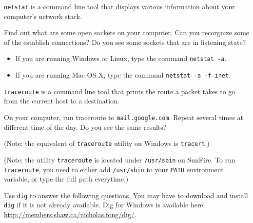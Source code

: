 \documentclass[a4paper,11pt]{exam}
\begin{document}
\begin{questions}

\texttt{netstat} is a command line tool that displays various information about your computer's network stack.

Find out what are some open sockets on your computer.  Can you recorgnize some of the establish connections?  Do you see some sockets that are in listening state?
\begin{itemize}
\item If you are running Windows or Linux, type the command \texttt{netstat -a}.
\item If you are running Mac OS X, type the command \texttt{netstat -a -f inet}.
\end{itemize}



\texttt{traceroute} is a command line tool that prints the route a packet takes to go from the current host to a destination.

On your computer, run traceroute to \texttt{mail.google.com}.  Repeat several times at different time of the day.  Do you see the same results?

(Note: the equivalent of \texttt{traceroute} utility on Windows is \texttt{tracert}.)

(Note: the utility \texttt{traceroute} is located under \texttt{/usr/sbin} on SunFire.  To run \texttt{traceroute}, you need to either add \texttt{/usr/sbin} to your \texttt{PATH} environment variable, or type the full path everytime.)



Use \texttt{dig} to answer the following questions.  You may have to download and install \texttt{dig} if it is not already available.  Dig for Windows is available here \url{http://members.shaw.ca/nicholas.fong/dig/}.

\end{questions}
\end{document}

